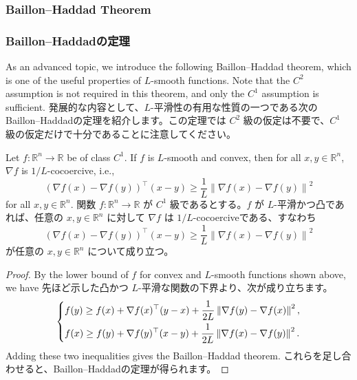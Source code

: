 \documentclass[0_main]{subfiles}
\begin{document}
\ifEn
    \subsubsection{Baillon--Haddad Theorem}
\else
    \subsubsection{Baillon--Haddadの定理}
\fi

\ifEn
    As an advanced topic, we introduce the following Baillon--Haddad theorem, which is one of the useful properties of $L$-smooth functions. Note that the $C^2$ assumption is not required in this theorem, and only the $C^1$ assumption is sufficient.
\else
    発展的な内容として、$L$-平滑性の有用な性質の一つである次の Baillon--Haddadの定理を紹介します。この定理では $C^2$ 級の仮定は不要で、$C^1$ 級の仮定だけで十分であることに注意してください。
\fi
\begin{proposition}\label{prop:baillon_haddad}
    \ifEn
        Let $f \colon \mathbb{R}^n \to \mathbb{R}$ be of class $C^1$. If $f$ is $L$-smooth and convex, then for all $x,y \in \mathbb{R}^n$, $\nabla f$ is $1/L$-cocoercive, i.e.,
        \begin{equation*}
            (\nabla f(x)-\nabla f(y))^\top (x-y) \ge \frac{1}{L} \left\lVert \nabla f(x)-\nabla f(y) \right\rVert^2
        \end{equation*}
        for all $x,y \in \mathbb{R}^n$.
    \else
        関数 $f \colon \mathbb{R}^n \to \mathbb{R}$ が $C^1$ 級であるとする。$f$ が $L$-平滑かつ凸であれば、任意の $x,y \in \mathbb{R}^n$ に対して $\nabla f$ は $1/L$-cocoerciveである、すなわち
        \begin{equation*}
            (\nabla f(x)-\nabla f(y))^\top (x-y) \ge \frac{1}{L} \left\lVert \nabla f(x)-\nabla f(y) \right\rVert^2
        \end{equation*}
        が任意の $x,y \in \mathbb{R}^n$ について成り立つ。
    \fi
\end{proposition}
\begin{proof}
    \ifEn
        By the lower bound of $f$ for convex and $L$-smooth functions shown above, we have
    \else
        先ほど示した凸かつ $L$-平滑な関数の下界より、次が成り立ちます。
    \fi
    \begin{equation*}
        \begin{dcases}
            f(y) \ge f(x) + \nabla f(x)^\top (y-x) + \frac{1}{2L} \left\lVert \nabla f(y) - \nabla f(x) \right\rVert^2, \\
            f(x) \ge f(y) + \nabla f(y)^\top (x-y) + \frac{1}{2L} \left\lVert \nabla f(x) - \nabla f(y) \right\rVert^2.
        \end{dcases}
    \end{equation*}
    \ifEn
        Adding these two inequalities gives the Baillon--Haddad theorem.
    \else
        これらを足し合わせると、Baillon--Haddadの定理が得られます。
    \fi
    \myQED
\end{proof}
\end{document}
